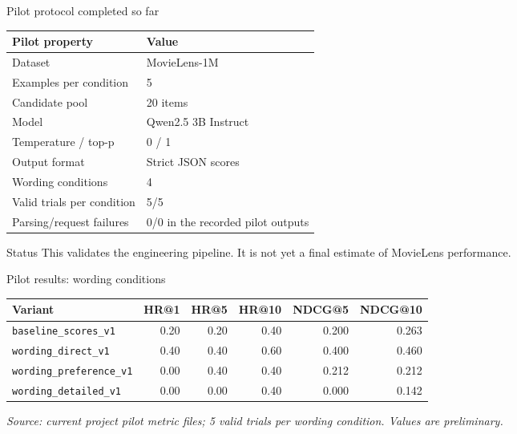 \documentclass[aspectratio=169,12pt]{beamer}
\newcommand{\source}[1]{\vspace{0.35em}\par{\tiny\color{Muted}\textit{#1}}}
\newcommand{\code}[1]{\texttt{\footnotesize #1}}
\begin{document}
\begin{frame}{Pilot protocol completed so far}
\begin{table}
\centering
\small
\begin{tabular}{ll}
\toprule
\textbf{Pilot property} & \textbf{Value}\\
\midrule
Dataset & MovieLens-1M\\
Examples per condition & 5\\
Candidate pool & 20 items\\
Model & Qwen2.5 3B Instruct\\
Temperature / top-p & 0 / 1\\
Output format & Strict JSON scores\\
Wording conditions & 4\\
Valid trials per condition & 5/5\\
Parsing/request failures & 0/0 in the recorded pilot outputs\\
\bottomrule
\end{tabular}
\end{table}

\begin{alertblock}{Status}
This validates the engineering pipeline. It is not yet a final estimate of
MovieLens performance.
\end{alertblock}
\end{frame}

\begin{frame}{Pilot results: wording conditions}
\begin{table}
\centering
\scriptsize
\begin{tabular}{lrrrrr}
\toprule
\textbf{Variant} & \textbf{HR@1} & \textbf{HR@5} & \textbf{HR@10}
& \textbf{NDCG@5} & \textbf{NDCG@10}\\
\midrule
\code{baseline\_scores\_v1} & 0.20 & 0.20 & 0.40 & 0.200 & 0.263\\
\code{wording\_direct\_v1} & 0.40 & 0.40 & 0.60 & 0.400 & 0.460\\
\code{wording\_preference\_v1} & 0.00 & 0.40 & 0.40 & 0.212 & 0.212\\
\code{wording\_detailed\_v1} & 0.00 & 0.00 & 0.40 & 0.000 & 0.142\\
\bottomrule
\end{tabular}
\end{table}

\source{Source: current project pilot metric files; 5 valid trials per wording condition. Values are preliminary.}
\end{frame}
\end{document}
